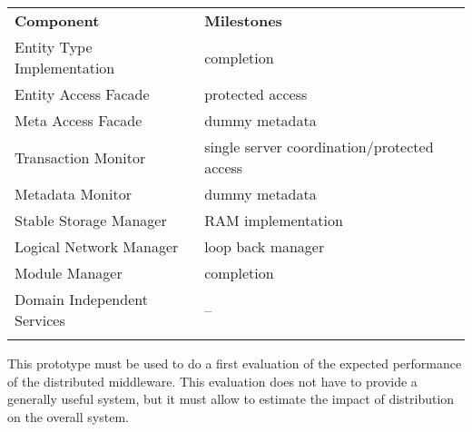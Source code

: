 \documentclass[a4paper, 10pt]{book}
\begin{document}
                                \begin{center}\begin{footnotesize}\begin{tabular}{||l|l||} \hhline{|t:==:t|}
                                    \textbf{Component}          & \textbf{Milestones}                            %
                                    \\ \hhline{|:==:|} 
                                    Entity Type Implementation  & completion                                     %
                                    \\ \hhline{||--||}
                                    Entity Access Facade        & protected access                                    %
                                    \\ \hhline{||--||}
                                    Meta Access Facade          & dummy metadata                                %
                                    \\ \hhline{||--||}
                                    Transaction Monitor         & single server coordination/protected access         %
                                    \\ \hhline{||--||}
                                    Metadata Monitor            & dummy metadata                                %
                                    \\ \hhline{||--||}
                                    Stable Storage Manager      & RAM implementation                             %
                                    \\ \hhline{||--||}
                                    Logical Network Manager     & loop back manager                              %
                                    \\ \hhline{||--||}
                                    Module Manager              & completion                                     %
                                    \\ \hhline{||--||}
                                    Domain Independent Services & -- %
                                    \\ \hhline{|b:==:b|}
                                \end{tabular}\end{footnotesize}\end{center}
                                This prototype must be used to do a first evaluation of the expected
                                performance of the distributed middleware. This evaluation does not
                                have to provide a generally useful system, but it must allow to
                                estimate the impact of distribution on the overall system.
\end{document}
